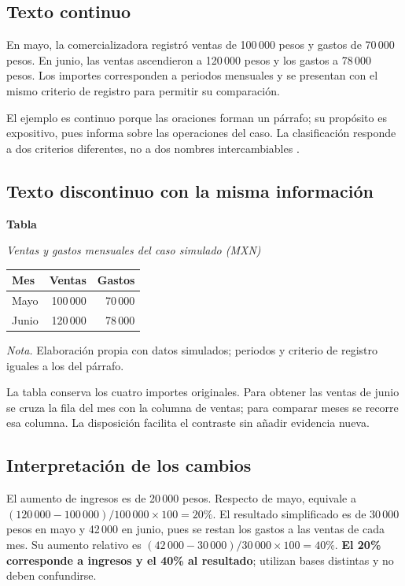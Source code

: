 \subsection{Texto continuo}

En mayo, la comercializadora registró ventas de 100\,000 pesos y gastos
de 70\,000 pesos. En junio, las ventas ascendieron a 120\,000 pesos y
los gastos a 78\,000 pesos. Los importes corresponden a periodos
mensuales y se presentan con el mismo criterio de registro para permitir
su comparación.

El ejemplo es continuo porque las oraciones forman un párrafo; su
propósito es expositivo, pues informa sobre las operaciones del caso.
La clasificación responde a dos criterios diferentes, no a dos
nombres intercambiables \parencite[p.~3]{gracida2012}.

\subsection{Texto discontinuo con la misma información}

\label{tab:datos}
\noindent\textbf{Tabla \thetable}\par
\noindent\textit{Ventas y gastos mensuales del caso simulado (MXN)}\par
\nobreak
\noindent\begin{tabularx}{\textwidth}{@{}Yrr@{}}
\toprule
\textbf{Mes} & \textbf{Ventas} & \textbf{Gastos} \\
\midrule
Mayo & 100\,000 & 70\,000 \\
Junio & 120\,000 & 78\,000 \\
\bottomrule
\end{tabularx}
\par\noindent\textit{Nota.} Elaboración propia con datos simulados;
periodos y criterio de registro iguales a los del párrafo.

La tabla conserva los cuatro importes originales. Para obtener las
ventas de junio se cruza la fila del mes con la columna de ventas;
para comparar meses se recorre esa columna. La disposición facilita
el contraste sin añadir evidencia nueva.

\subsection{Interpretación de los cambios}

El aumento de ingresos es de 20\,000 pesos. Respecto de mayo, equivale
a \((120\,000-100\,000)/100\,000\times100=20\%\).
El resultado simplificado es de 30\,000 pesos en mayo y 42\,000 en
junio, pues se restan los gastos a las ventas de cada mes. Su aumento
relativo es \((42\,000-30\,000)/30\,000\times100=40\%\).
\textbf{El 20\% corresponde a ingresos y el 40\% al resultado};
utilizan bases distintas y no deben confundirse.

